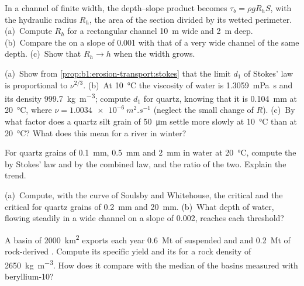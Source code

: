 \begin{exercise}[$\star\star$]\label{exo:b1:erosion-transport:5}
In a channel of finite width, the depth--slope product becomes $\tau_b =
\rho g R_h S$, with the hydraulic radius $R_h$, the area of the section
divided by its wetted perimeter. (a)~Compute $R_h$ for a rectangular channel
\qty{10}{m} wide and \qty{2}{m} deep. (b)~Compare the  on a
slope of \num{0.001} with that of a very wide channel of the same depth.
(c)~Show that $R_h \to h$ when the width grows.
\end{exercise}

\begin{exercise}[$\star\star$]\label{exo:b1:erosion-transport:6}
(a)~Show from \cref{prop:b1:erosion-transport:stokes} that the limit $d_1$ of
Stokes' law is proportional to $\nu^{2/3}$. (b)~At \qty{10}{\celsius} the
viscosity of water is \qty{1.3059}{mPa.s} and its density
\qty{999.7}{kg.m^{-3}}; compute $d_1$ for quartz, knowing that it is
\qty{0.104}{mm} at \qty{20}{\celsius}, where $\nu = \qty{1.0034e-6}{m^2.s^{-1}}$
(neglect the small change of $R$). (c)~By what factor does a quartz silt
grain of \qty{50}{\micro m} settle more slowly at \qty{10}{\celsius} than at
\qty{20}{\celsius}? What does this mean for a river in winter?
\end{exercise}

\begin{exercise}[$\star\star$]\label{exo:b1:erosion-transport:7}
For quartz grains of \qty{0.1}{mm}, \qty{0.5}{mm} and \qty{2}{mm} in water at
\qty{20}{\celsius}, compute the  by Stokes' law and by the
combined law, and the ratio of the two. Explain the trend.
\end{exercise}

\begin{exercise}[$\star\star$]\label{exo:b1:erosion-transport:8}
(a)~Compute, with the curve of Soulsby and Whitehouse, the critical  and the
critical  for quartz grains of \qty{0.2}{mm} and
\qty{20}{mm}. (b)~What depth of water, flowing steadily in a wide channel on a
slope of \num{0.002}, reaches each threshold?
\end{exercise}

\begin{exercise}[$\star\star$]\label{exo:b1:erosion-transport:9}
A basin of \qty{2000}{km^2} exports each year \qty{0.6}{Mt} of suspended and
 and \qty{0.2}{Mt} of rock-derived . Compute its specific
yield and its  for a rock density of
\qty{2650}{kg.m^{-3}}. How does it compare with the median of the basins
measured with beryllium-10?
\end{exercise}

